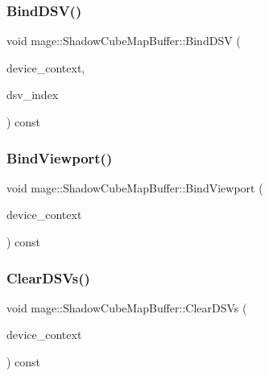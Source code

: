 \subsubsection{\texorpdfstring{Bind\+D\+S\+V()}{BindDSV()}}
{\footnotesize\ttfamily void mage\+::\+Shadow\+Cube\+Map\+Buffer\+::\+Bind\+D\+SV (\begin{DoxyParamCaption}\item[{I\+D3\+D11\+Device\+Context2 $\ast$}]{device\+\_\+context,  }\item[{size\+\_\+t}]{dsv\+\_\+index }\end{DoxyParamCaption}) const\hspace{0.3cm}{\ttfamily [noexcept]}}

\hypertarget{structmage_1_1_shadow_cube_map_buffer_abc8eb7d1ebf0cafb8b626bc5cc7c4c71}{}\label{structmage_1_1_shadow_cube_map_buffer_abc8eb7d1ebf0cafb8b626bc5cc7c4c71} 
\subsubsection{\texorpdfstring{Bind\+Viewport()}{BindViewport()}}
{\footnotesize\ttfamily void mage\+::\+Shadow\+Cube\+Map\+Buffer\+::\+Bind\+Viewport (\begin{DoxyParamCaption}\item[{I\+D3\+D11\+Device\+Context2 $\ast$}]{device\+\_\+context }\end{DoxyParamCaption}) const\hspace{0.3cm}{\ttfamily [noexcept]}}

\hypertarget{structmage_1_1_shadow_cube_map_buffer_a302478177db8ed02a8fb610d308be9a1}{}\label{structmage_1_1_shadow_cube_map_buffer_a302478177db8ed02a8fb610d308be9a1} 
\subsubsection{\texorpdfstring{Clear\+D\+S\+Vs()}{ClearDSVs()}}
{\footnotesize\ttfamily void mage\+::\+Shadow\+Cube\+Map\+Buffer\+::\+Clear\+D\+S\+Vs (\begin{DoxyParamCaption}\item[{I\+D3\+D11\+Device\+Context2 $\ast$}]{device\+\_\+context }\end{DoxyParamCaption}) const\hspace{0.3cm}{\ttfamily [noexcept]}}

